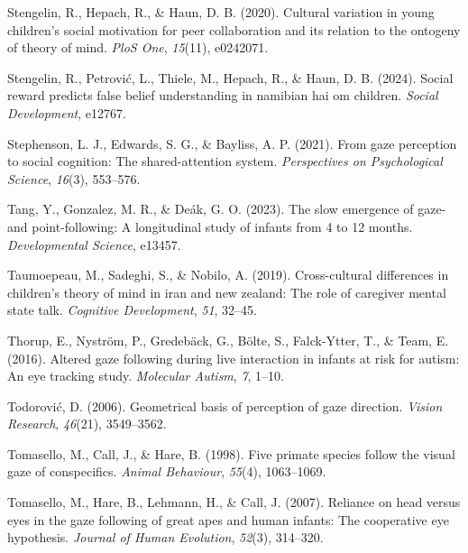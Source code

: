 \documentclass[
  man,floatsintext]{apa7}
\newlength{\cslhangindent}
\newlength{\cslentryspacingunit} %
\newenvironment{CSLReferences}[2] %
 {%
  \setlength{\parindent}{0pt}
  \ifodd #1
  \let\oldpar\par
  \def\par{\hangindent=\cslhangindent\oldpar}
  \fi
  \setlength{\parskip}{#2\cslentryspacingunit}
 }%
 {}
\begin{document}
\begin{CSLReferences}{1}{0}
\leavevmode{}%
Stengelin, R., Hepach, R., \& Haun, D. B. (2020). Cultural variation in young children's social motivation for peer collaboration and its relation to the ontogeny of theory of mind. \emph{PloS One}, \emph{15}(11), e0242071.

\leavevmode{}%
Stengelin, R., Petrović, L., Thiele, M., Hepach, R., \& Haun, D. B. (2024). Social reward predicts false belief understanding in namibian hai\textbar\textbar{} om children. \emph{Social Development}, e12767.

\leavevmode{}%
Stephenson, L. J., Edwards, S. G., \& Bayliss, A. P. (2021). From gaze perception to social cognition: The shared-attention system. \emph{Perspectives on Psychological Science}, \emph{16}(3), 553--576.

\leavevmode{}%
Tang, Y., Gonzalez, M. R., \& Deák, G. O. (2023). The slow emergence of gaze-and point-following: A longitudinal study of infants from 4 to 12 months. \emph{Developmental Science}, e13457.

\leavevmode{}%
Taumoepeau, M., Sadeghi, S., \& Nobilo, A. (2019). Cross-cultural differences in children's theory of mind in iran and new zealand: The role of caregiver mental state talk. \emph{Cognitive Development}, \emph{51}, 32--45.

\leavevmode{}%
Thorup, E., Nyström, P., Gredebäck, G., Bölte, S., Falck-Ytter, T., \& Team, E. (2016). Altered gaze following during live interaction in infants at risk for autism: An eye tracking study. \emph{Molecular Autism}, \emph{7}, 1--10.

\leavevmode{}%
Todorović, D. (2006). Geometrical basis of perception of gaze direction. \emph{Vision Research}, \emph{46}(21), 3549--3562.

\leavevmode{}%
Tomasello, M., Call, J., \& Hare, B. (1998). Five primate species follow the visual gaze of conspecifics. \emph{Animal Behaviour}, \emph{55}(4), 1063--1069.

\leavevmode{}%
Tomasello, M., Hare, B., Lehmann, H., \& Call, J. (2007). Reliance on head versus eyes in the gaze following of great apes and human infants: The cooperative eye hypothesis. \emph{Journal of Human Evolution}, \emph{52}(3), 314--320.


\end{CSLReferences}
\end{document}
